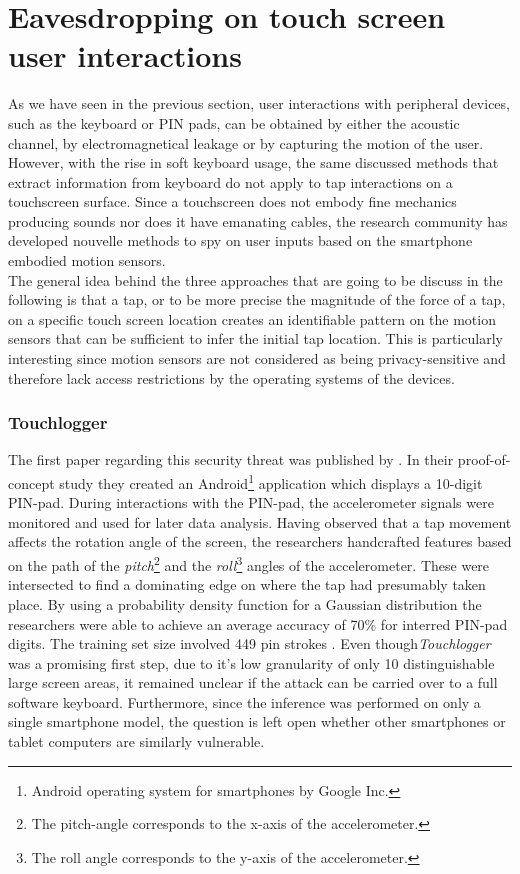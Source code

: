 \section{Eavesdropping on touch screen user interactions}
As we have seen in the previous section, user interactions with peripheral devices, such as the keyboard or PIN pads, can be obtained by either the acoustic channel, by electromagnetical leakage or by capturing the motion of the user. However, with the rise in soft keyboard usage, the same discussed methods that extract information from keyboard do not apply to tap interactions on a touchscreen surface. Since a touchscreen does not embody fine mechanics producing sounds nor does it have emanating cables, the research community has developed nouvelle methods to spy on user inputs based on the smartphone embodied motion sensors.\\

The general idea behind the three approaches that are going to be discuss in the following is that a tap, or to be more precise the magnitude of the force of a tap, on a specific touch screen location creates an identifiable pattern on the motion sensors that can be sufficient to infer the initial tap location. This is particularly interesting since motion sensors are not considered as being privacy-sensitive and therefore lack access restrictions by the operating systems of the devices.

\subsubsection{Touchlogger}

The first paper regarding this security threat was published by \citeauthor{Touchlogger}. In their proof-of-concept study they created an Android\footnote{Android operating system for smartphones by Google Inc.} application which displays a 10-digit PIN-pad. During interactions with the PIN-pad, the accelerometer signals were monitored and used for later data analysis. Having observed that a tap movement affects the rotation angle of the screen, the researchers handcrafted features based on the path of the \textit{pitch}\footnote{The pitch-angle corresponds to the x-axis of the accelerometer.} and the \textit{roll}\footnote{The roll angle corresponds to the y-axis of the accelerometer.} angles of the accelerometer. These were intersected to find a dominating edge on where the tap had presumably taken place. By using a probability density function for a Gaussian distribution the researchers were able to achieve an average accuracy of 70\% for interred PIN-pad digits. The training set size involved 449 pin strokes \cite{Touchlogger}. Even though\textit{Touchlogger} was a promising first step, due to it's low granularity of only 10 distinguishable large screen areas, it remained unclear if the attack can be carried over to a full software keyboard. Furthermore, since the inference was performed on only a single smartphone model, the question is left open whether other smartphones or tablet computers are similarly vulnerable.


